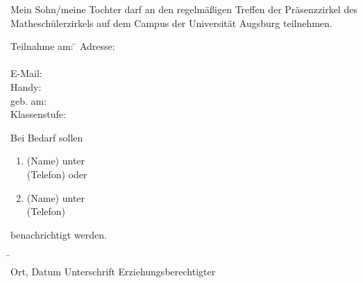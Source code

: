 \documentclass{mamazettel}
\begin{document}
\renewcommand{\datum}{9.11.2013}
\renewcommand{\betreff}{Anmeldung zum Matheschülerzirkel der Universität Augsburg}

\makeletterhead

Mein Sohn/meine Tochter \freist{} darf an den regelmäßigen Treffen der
Präsenzzirkel des Matheschülerzirkels auf dem Campus der Universität Augsburg
teilnehmen.

\doublespacing

\begin{tabbing}
  Teilnahme am: \= \kill
  Adresse: \> \freist \\
  \> \freist \\
  E-Mail: \> \freist \\
  Handy: \> \freist \\
  geb. am: \> \freist \\
  Klassenstufe: \> \freistKurz
\end{tabbing}

Bei Bedarf sollen
\begin{enumerate}
\item \freist{} (Name) unter \\ \freist{} (Telefon) oder
\item \freist{} (Name) unter \\ \freist{} (Telefon)
\end{enumerate}
benachrichtigt werden.

\begin{tabbing}
  \freistMittel \qquad\qquad \= \kill
  \freistMittel \> \freistLaenger \\
  Ort, Datum \> Unterschrift Erziehungsberechtigter
\end{tabbing}
\end{document}
